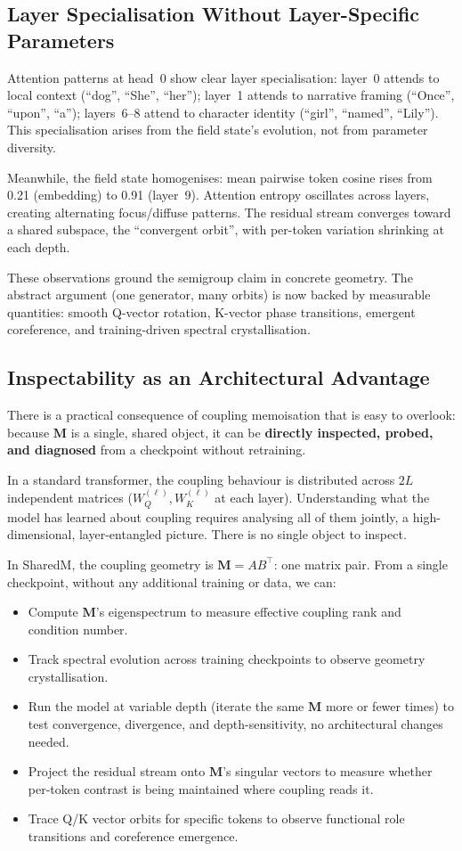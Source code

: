 \documentclass[11pt, a4paper]{article}
\newcommand{\M}{\mathbf{M}}
\theoremstyle{remark}
\begin{document}
\subsection{Layer Specialisation Without Layer-Specific Parameters}

Attention patterns at head~0 show clear layer specialisation:
layer~0 attends to local context (``dog'', ``She'', ``her'');
layer~1 attends to narrative framing (``Once'', ``upon'', ``a'');
layers~6--8 attend to character identity (``girl'', ``named'', ``Lily'').
This specialisation arises from the field state's evolution, not from parameter diversity.

Meanwhile, the field state homogenises: mean pairwise token cosine rises from 0.21 (embedding) to 0.91 (layer~9).
Attention entropy oscillates across layers, creating alternating focus/diffuse patterns.
The residual stream converges toward a shared subspace, the ``convergent orbit'', with per-token variation shrinking at each depth.

These observations ground the semigroup claim in concrete geometry.
The abstract argument (one generator, many orbits) is now backed by measurable quantities: smooth Q-vector rotation, K-vector phase transitions, emergent coreference, and training-driven spectral crystallisation.

\subsection{Inspectability as an Architectural Advantage}

There is a practical consequence of coupling memoisation that is easy to overlook: because $\M$ is a single, shared object, it can be \textbf{directly inspected, probed, and diagnosed} from a checkpoint without retraining.

In a standard transformer, the coupling behaviour is distributed across $2L$ independent matrices ($W_Q^{(\ell)}, W_K^{(\ell)}$ at each layer).
Understanding what the model has learned about coupling requires analysing all of them jointly, a high-dimensional, layer-entangled picture.
There is no single object to inspect.

In SharedM, the coupling geometry is $\M = AB^\top$: one matrix pair.
From a single checkpoint, without any additional training or data, we can:
\begin{itemize}[nosep]
    \item Compute $\M$'s eigenspectrum to measure effective coupling rank and condition number.
    \item Track spectral evolution across training checkpoints to observe geometry crystallisation.
    \item Run the model at variable depth (iterate the same $\M$ more or fewer times) to test convergence, divergence, and depth-sensitivity, no architectural changes needed.
    \item Project the residual stream onto $\M$'s singular vectors to measure whether per-token contrast is being maintained where coupling reads it.
    \item Trace Q/K vector orbits for specific tokens to observe functional role transitions and coreference emergence.
\end{itemize}
\end{document}
